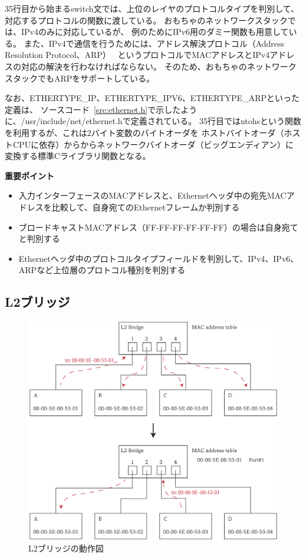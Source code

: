 35行目から始まるswitch文では、上位のレイヤのプロトコルタイプを判別して、
対応するプロトコルの関数に渡している。
おもちゃのネットワークスタックでは、IPv4のみに対応しているが、
例のためにIPv6用のダミー関数も用意している。
また、IPv4で通信を行うためには、アドレス解決プロトコル（Address Resolution Protocol、ARP）~\cite{RFC0862}
というプロトコルでMACアドレスとIPv4アドレスの対応の解決を行わなければならない。
そのため、おもちゃのネットワークスタックでもARPをサポートしている。

なお、ETHERTYPE\_IP、ETHERTYPE\_IPV6、ETHERTYPE\_ARPといった定義は、
ソースコード~\ref{src:ethernet.h}で示したように、/usr/include/net/ethernet.hで定義されている。
35行目ではntohsという関数を利用するが、これは2バイト変数のバイトオーダを
ホストバイトオーダ（ホストCPUに依存）からからネットワークバイトオーダ（ビッグエンディアン）に
変換する標準Cライブラリ関数となる。

\begin{itembox}[l]{\bf 重要ポイント}
    \begin{itemize}
        \item 入力インターフェースのMACアドレスと、Ethernetヘッダ中の宛先MACアドレスを比較して、自身宛てのEthernetフレームか判別する
        \item ブロードキャストMACアドレス（FF-FF-FF-FF-FF-FF）の場合は自身宛てと判別する
        \item Ethernetヘッダ中のプロトコルタイプフィールドを判別して、IPv4、IPv6、ARPなど上位層のプロトコル種別を判別する
    \end{itemize}
\end{itembox}

\subsection{L2ブリッジ} \label{sec:l2bridge}

\begin{figure}[tb]
    \centering
    \includegraphics[width=14cm,pagebox=artbox]{figs/bridge.pdf}
    \caption{L2ブリッジの動作図}
    \label{fig:bridge}
\end{figure}

